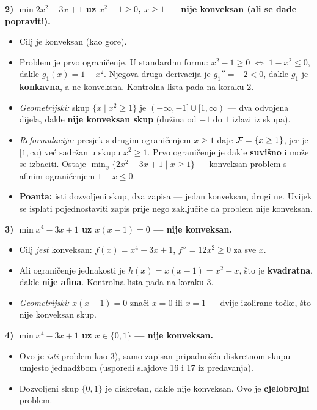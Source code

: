 \begin{zadatak}
\textbf{2) $\min 2x^2 - 3x + 1$ uz $x^2 - 1 \ge 0$, $x \ge 1$ --- nije
konveksan (ali se dade popraviti).}
\begin{itemize}
  \item Cilj je konveksan (kao gore).
  \item Problem je prvo ograničenje. U standardnu formu: $x^2 - 1 \ge 0$
        $\Leftrightarrow$ $1 - x^2 \le 0$, dakle $g_1(x) = 1 - x^2$. Njegova
        druga derivacija je $g_1'' = -2 < 0$, dakle $g_1$ je
        \textbf{konkavna}, a ne konveksna. Kontrolna lista pada na koraku 2.
  \item \emph{Geometrijski:} skup $\{x \mid x^2 \ge 1\}$ je
        $(-\infty,-1] \cup [1,\infty)$ --- dva odvojena dijela, dakle
        \textbf{nije konveksan skup} (dužina od $-1$ do $1$ izlazi iz skupa).
  \item \emph{Reformulacija:} presjek s drugim ograničenjem $x \ge 1$ daje
        $\mathcal{F} = \{x \ge 1\}$, jer je $[1,\infty)$ već sadržan u skupu
        $x^2\ge1$. Prvo ograničenje je dakle \textbf{suvišno} i može se
        izbaciti. Ostaje $\min_x\{2x^2-3x+1 \mid x \ge 1\}$ --- konveksan
        problem s afinim ograničenjem $1 - x \le 0$. \checkmark
  \item \textbf{Poanta:} isti dozvoljeni skup, dva zapisa --- jedan konveksan,
        drugi ne. Uvijek se isplati pojednostaviti zapis prije nego zaključite
        da problem nije konveksan.
\end{itemize}

\textbf{3) $\min x^4 - 3x + 1$ uz $x(x-1) = 0$ --- nije konveksan.}
\begin{itemize}
  \item Cilj \emph{jest} konveksan: $f(x) = x^4 - 3x + 1$, $f'' = 12x^2 \ge 0$
        za sve $x$.
  \item Ali ograničenje jednakosti je $h(x) = x(x-1) = x^2 - x$, što je
        \textbf{kvadratna}, dakle \textbf{nije afina}. Kontrolna lista pada na
        koraku 3.
  \item \emph{Geometrijski:} $x(x-1) = 0$ znači $x = 0$ ili $x = 1$ --- dvije
        izolirane točke, što nije konveksan skup.
\end{itemize}

\textbf{4) $\min x^4 - 3x + 1$ uz $x \in \{0,1\}$ --- nije konveksan.}
\begin{itemize}
  \item Ovo je \emph{isti} problem kao 3), samo zapisan pripadnošću diskretnom
        skupu umjesto jednadžbom (usporedi slajdove 16 i 17 iz
        predavanja).
  \item Dozvoljeni skup $\{0,1\}$ je diskretan, dakle nije konveksan. Ovo je
        \textbf{cjelobrojni} problem.
\end{itemize}


\end{zadatak}
